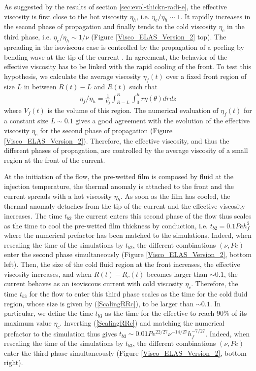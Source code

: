 As suggested  by the results of  section \ref{sec:evol-thickn-radi-e},
the effective viscosity is first  close to the hot viscosity $\eta_h$,
i.e.   $\eta_e/\eta_h \sim  1$.  It  rapidly increases  in the  second
phase of propagation and finally  tends to the cold viscosity $\eta_c$
in  the   third  phase,  i.e.   $\eta_e/\eta_h   \sim  1/\nu$  (Figure
\ref{Visco_ELAS_Version_2} top).  The spreading in the isoviscous case
is controlled by  the propagation of a peeling by  bending wave at the
tip of the current  \citep{Lister:2013ia}.  In agreement, the behavior
of the effective viscosity has to  be linked with the rapid cooling of
the  front.   To  test  this  hypothesis,  we  calculate  the  average
viscosity $\eta_f(t)$ over a fixed front region of size $L$ in between
$R(t)-L$ and $R(t)$ such that
\begin{eqnarray}
  \eta_f/\eta_h =
  \frac{1}{V_f}\int_{R-L}^{R}\int_0^{h}  r  \eta(\theta)
  dr dz \label{front-visco}
\end{eqnarray}
where $V_f(t)$ is the volume of this region.  The numerical evaluation
of $\eta_f(t)$ for a constant size $L \sim 0.1$ gives a good agreement
with the evolution of the  effective viscosity $\eta_e$ for the second
phase of propagation  (Figure \ref{Visco_ELAS_Version_2}).  Therefore,
the effective viscosity, and thus the different phases of propagation,
are controlled by the average viscosity of a small region at the front
of the current.

At the  initiation of  the flow,  the pre-wetted  film is  composed by
fluid at the injection temperature, the thermal anomaly is attached to
the front  and the current spreads  with a hot viscosity  $\eta_h$. As
soon as the film has cooled, the thermal anomaly detaches from the tip
of  the  current and  the  effective  viscosity increases.   The  time
$t_{b2}$ the current enters this second  phase of the flow thus scales
as the time to cool the  pre-wetted film thickness by conduction, i.e.
$t_{b2}=0.1Peh_f^2$ where the numerical  prefactor has been matched to
the simulations.  Indeed, when rescaling the time of the simulations by
$t_{b2}$, the different combinations $(\nu,Pe)$ enter the second phase
simultaneously   (Figure  \ref{Visco_ELAS_Version_2},   bottom  left).
Then, the  size of the cold  fluid region at the  front increases, the
effective viscosity  increases, and when $R(t)-R_c(t)$  becomes larger
than $\sim  0.1$, the  current behaves as  an isoviscous  current with
cold viscosity $\eta_c$.  Therefore, the time $t_{b3}$ for the flow to
enter this third  phase scales as the time for  the cold fluid region,
whose  size  is  given  by   (\ref{ScalingRRc}),  to  be  larger  than
$\sim 0.1$. In  particular, we define the time $t_{b3}$  as the time for
the  effective  to  reach  $90\%$   of  its  maximum  value  $\eta_c$.
Inverting (\ref{ScalingRRc})  and matching the numerical  prefactor to
the                simulation                thus                gives
$t_{b3}\sim  0.01  Pe^{22/27}\nu^{-14/27}h_f^{-7/27}$.   Indeed,  when
rescaling  the time  of  the simulations  by  $t_{b3}$, the  different
combinations $(\nu,Pe)$  enter the third phase  simultaneously (Figure
\ref{Visco_ELAS_Version_2}, bottom right).

